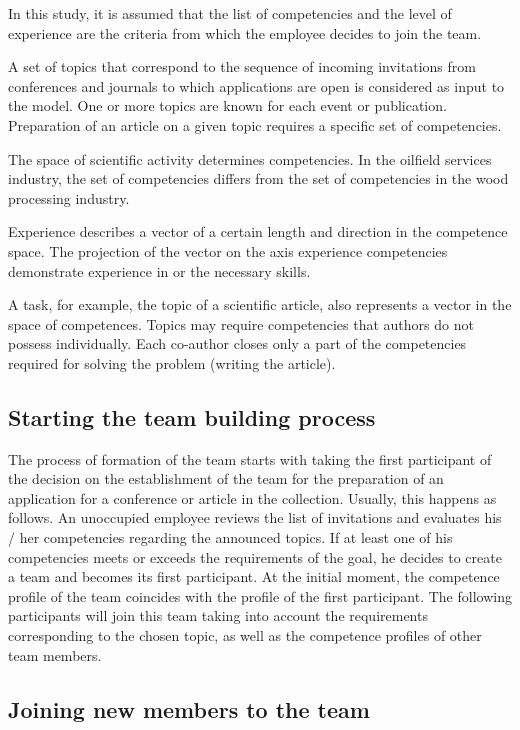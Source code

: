 \documentclass[12pt]{report}
\theoremstyle{definition}
\begin{document}
In this study, it is assumed that the list of competencies and the level of experience are the criteria from which the employee decides to join the team.

A set of topics that correspond to the sequence of incoming invitations from conferences and journals to which applications are open is considered as input to the model. 
One or more topics are known for each event or publication. 
Preparation of an article on a given topic requires a specific set of competencies. 

The space of scientific activity determines competencies. In the oilfield services industry, the set of competencies differs from the set of competencies in the wood processing industry. 

Experience describes a vector of a certain length and direction in the competence space. 
The projection of the vector on the axis experience competencies demonstrate experience in or the necessary skills. 

A task, for example, the topic of a scientific article, also represents a vector in the space of competences. 
Topics may require competencies that authors do not possess individually. 
Each co-author closes only a part of the competencies required for solving the problem (writing the article).

\subsection{Starting the team building process}

The process of formation of the team starts with taking the first participant of the decision on the establishment of the team for the preparation of an application for a conference or article in the collection.
Usually, this happens as follows. 
An unoccupied employee reviews the list of invitations and evaluates his / her competencies regarding the announced topics. 
If at least one of his competencies meets or exceeds the requirements of the goal, he decides to create a team and becomes its first participant.
At the initial moment, the competence profile of the team coincides with the profile of the first participant.
The following participants will join this team taking into account the requirements corresponding to the chosen topic, as well as the competence profiles of other team members.

\subsection{Joining new members to the team}
\end{document}
